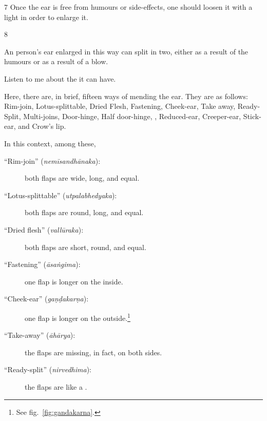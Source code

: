 \begin{translation}
    \item[7]
    Once the ear is free from humours or side-effects, one should 
    loosen it with a light  in order to enlarge it.
    
    \item[8]
    
    \begin{sloka}
        
        An person's ear enlarged in this way can split in two, either as a result of the 
        humours or as a result of a blow.  
        
        Listen to me about the  it 
        can have. 
        
    \end{sloka}
    
    Here, there are, in brief, fifteen ways of mending the ear.  They are as follows:
    Rim-join, Lotus-splittable, Dried Flesh, Fastening, Cheek-ear, Take away,
    Ready-Split, Multi-joins, Door-hinge, Half door-hinge, 
    , Reduced-ear,
    Creeper-ear, Stick-ear, and Crow's lip.
    
    In this context, among these, 
    \begin{description}
        
        \item[\mdseries``Rim-join'' (\emph{nemīsandhānaka}):]
        both flaps are wide, long, and equal.
        
        \item[\mdseries``Lotus-splittable'' (\emph{utpalabhedyaka}):]
        both flaps are round, long, and equal.
        
        \item[\mdseries``Dried flesh'' (\emph{vallūraka}):]
        both flaps are short, round, and equal.
        
        \item[\mdseries``Fastening'' (\emph{āsaṅgima}):]
        one flap is longer on the inside.
        
        \item[\mdseries``Cheek-ear'' (\emph{gaṇḍakarṇa}):]
        one flap is longer on the outside.\footnote{See fig.~\ref{fig:gandakarna}.}
        
        \item[\mdseries``Take-away'' (\emph{āhārya}):]
        the flaps are missing, in fact, on both sides.
        
        \item[\mdseries``Ready-split'' (\emph{nirvedhima}):]
        the flaps are like a .
        

\end{description}
\end{translation}
